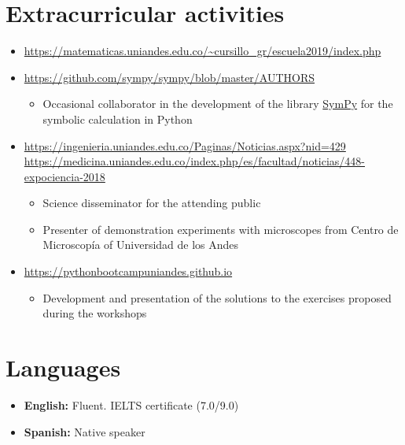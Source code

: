 \documentclass[11pt, letterpaper, sans]{moderncv}        %
\begin{document}
\section{Extracurricular activities}
	\begin{itemize}
		\item{
			{
				\url{https://matematicas.uniandes.edu.co/~cursillo_gr/escuela2019/index.php}
			}
		}
	
		\item{
			{
				\url{https://github.com/sympy/sympy/blob/master/AUTHORS}
				\vspace{3pt}
				\begin{itemize}
					\item Occasional collaborator in the development of the library \href{https://www.sympy.org/en/index.html}{\color{blue}SymPy} for the symbolic calculation in {\color{blue}Python}
				\end{itemize}
			}
		}
		
		\item{
			{
				\url{https://ingenieria.uniandes.edu.co/Paginas/Noticias.aspx?nid=429}\\
				\url{https://medicina.uniandes.edu.co/index.php/es/facultad/noticias/448-expociencia-2018}
				\vspace{3pt}
				\begin{itemize}
					\item Science disseminator for the attending public
					\item Presenter of demonstration experiments with microscopes from Centro de Microscop\'ia of Universidad de los Andes
				\end{itemize}
			}
		}
	
		\item{
			{
				\url{https://pythonbootcampuniandes.github.io}
				\vspace{3pt}
				\begin{itemize}
					\item Development and presentation of the solutions to the exercises proposed during the workshops
				\end{itemize}
			}
		}
	\end{itemize}

\section{Languages}
\vspace{6pt}

\begin{itemize}
	\item \textbf{English:} Fluent. IELTS certificate (7.0/9.0)
	\item \textbf{Spanish:} Native speaker
\end{itemize}

\vfill
\enlargethispage{\footskip}
\let\thefootnote\relax{}
\end{document}

